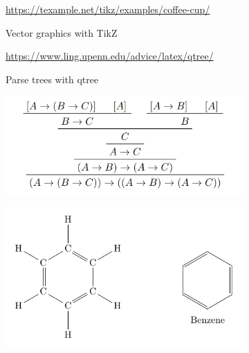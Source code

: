 \begin{figure}[p]
{\begin{subfigure}{\widefigurewidth}
		\end{subfigure}
		\colrules
		\begin{subfigure}[t]{\widefigurewidth}
			\caption{Vector graphics with TikZ}
			\centering\tiny{\url{https://texample.net/tikz/examples/coffee-cup/}}
			\label{fig:tikz-example}
		\end{subfigure}
		\hspace{\widefiguregap}
		\begin{subfigure}[t]{\widefigurewidth}
			\caption{Parse trees with qtree}
			\centering\tiny{\url{https://www.ling.upenn.edu/advice/latex/qtree/}}
			\label{fig:qtree-example}
		\end{subfigure}
		\medskip

		\colrules
		\begin{subfigure}{\widefigurewidth}
			\includegraphics[width=\linewidth]{graphics/prftree.png}
		\end{subfigure}
		\hspace{\widefiguregap}
		\begin{subfigure}{\widefigurewidth}
			\includegraphics[width=\linewidth]{graphics/benzene-ring.pdf}

\end{subfigure}}
\end{figure}
